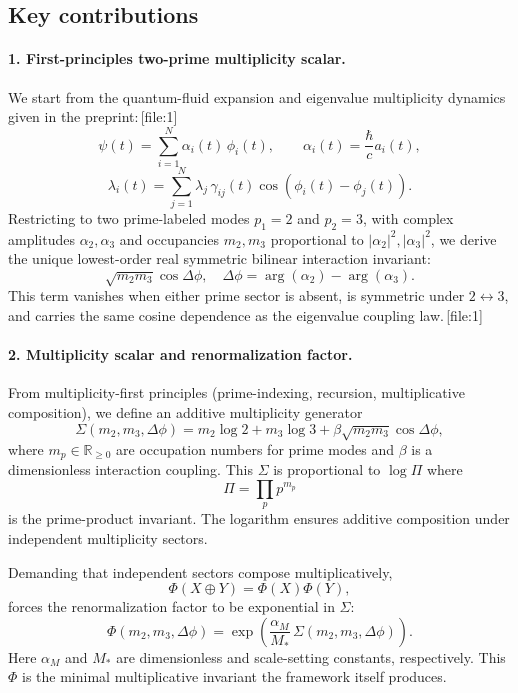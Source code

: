 \documentclass[11pt]{article}
\begin{document}
\subsection*{Key contributions}

\paragraph{1. First-principles two-prime multiplicity scalar.}

We start from the quantum-fluid expansion and eigenvalue multiplicity dynamics given in the preprint:\,[file:1]
\[
\psi(t) = \sum_{i=1}^N \alpha_i(t)\,\phi_i(t),\qquad \alpha_i(t) = \frac{\hbar}{c} a_i(t),
\]
\[
\lambda_i(t) = \sum_{j=1}^N \lambda_j\,\gamma_{ij}(t)\cos(\phi_i(t)-\phi_j(t)).
\]
Restricting to two prime-labeled modes \(p_1=2\) and \(p_2=3\), with complex amplitudes \(\alpha_2,\alpha_3\) and occupancies \(m_2,m_3\) proportional to \(|\alpha_2|^2,|\alpha_3|^2\), we derive the unique lowest-order real symmetric bilinear interaction invariant:
\[
\sqrt{m_2 m_3}\cos\Delta\phi,\quad \Delta\phi = \arg(\alpha_2) - \arg(\alpha_3).
\]
This term vanishes when either prime sector is absent, is symmetric under \(2\leftrightarrow 3\), and carries the same cosine dependence as the eigenvalue coupling law.\,[file:1]

\paragraph{2. Multiplicity scalar and renormalization factor.}

From multiplicity-first principles (prime-indexing, recursion, multiplicative composition), we define an additive multiplicity generator
\[
\Sigma(m_2,m_3,\Delta\phi) = m_2\log 2 + m_3\log 3 + \beta \sqrt{m_2 m_3}\cos\Delta\phi,
\]
where \(m_p\in\mathbb{R}_{\ge0}\) are occupation numbers for prime modes and \(\beta\) is a dimensionless interaction coupling. This \(\Sigma\) is proportional to \(\log\Pi\) where
\[
\Pi = \prod_p p^{m_p}
\]
is the prime-product invariant. The logarithm ensures additive composition under independent multiplicity sectors.

Demanding that independent sectors compose multiplicatively,
\[
\Phi(X\oplus Y) = \Phi(X) \Phi(Y),
\]
forces the renormalization factor to be exponential in \(\Sigma\):
\[
\Phi(m_2,m_3,\Delta\phi) =
\exp\!\left(\frac{\alpha_M}{M_*}\,\Sigma(m_2,m_3,\Delta\phi)\right).
\]
Here \(\alpha_M\) and \(M_*\) are dimensionless and scale-setting constants, respectively. This \(\Phi\) is the minimal multiplicative invariant the framework itself produces.
\end{document}
